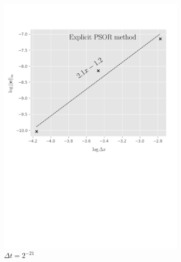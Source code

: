 \begin{figure}[H]
  \centering
  \begin{subfigure}{0.4\textwidth}
    \centering
    \includegraphics[width=\textwidth]{chapters/chapter5/ConvergenceSpaceExplicitLCP.pdf}
    \caption{$\Delta{x}=2^{-7},\dots,2^{-10}$}
    \caption*{$\Delta{t}=2^{-21}$}
    \label{fig:lcp:numericalresults:convergence_space_explicit}
  \end{subfigure}
  \hspace{0.5cm}
  \begin{subfigure}{0.4\textwidth}
    \centering

\end{subfigure}
\end{figure}
